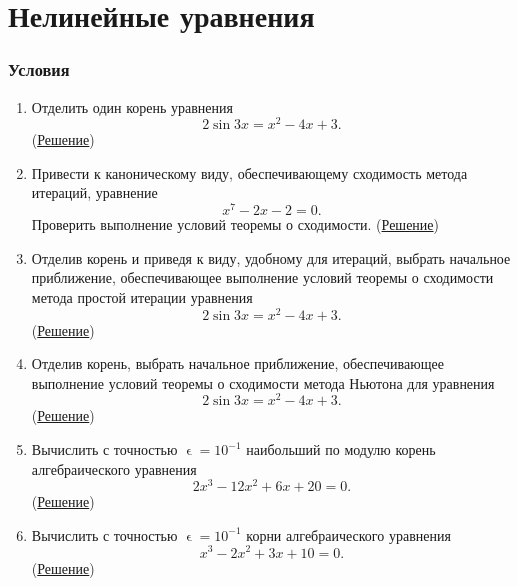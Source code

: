 \documentclass[a4paper, 12pt]{article}
\renewcommand{\epsilon}{\upvarepsilon}
\begin{document}
	\section*{Нелинейные уравнения}
	\subsubsection*{Условия}
	\begin{enumerate}
		\item Отделить один корень уравнения $$2\sin3x = x^2 - 4x + 3.$$ (\hyperlink{t1}{Решение})
		\item Привести к каноническому виду, обеспечивающему сходимость метода итераций, уравнение $$x^7 - 2x - 2=0.$$ Проверить выполнение условий теоремы о сходимости. (\hyperlink{t2}{Решение})
		\item Отделив корень и приведя к виду, удобному для итераций, выбрать начальное приближение, обеспечивающее выполнение условий теоремы о сходимости метода простой итерации уравнения $$2\sin3x = x^2 - 4x + 3.$$ (\hyperlink{t3}{Решение})
		\item Отделив корень, выбрать начальное приближение, обеспечивающее выполнение условий теоремы о сходимости метода Ньютона для уравнения $$2\sin3x = x^2 - 4x + 3.$$ (\hyperlink{t4}{Решение})
		\item Вычислить с точностью $\epsilon=10^{-1}$ наибольший по модулю корень алгебраического уравнения $$2x^3-12x^2+6x +20 = 0.$$ (\hyperlink{t5}{Решение})
		\item Вычислить с точностью $\epsilon=10^{-1}$ корни алгебраического уравнения $$x^3-2x^2+3x +10 = 0.$$ (\hyperlink{t6}{Решение})
	\end{enumerate}
	
	\newpage
\end{document}
